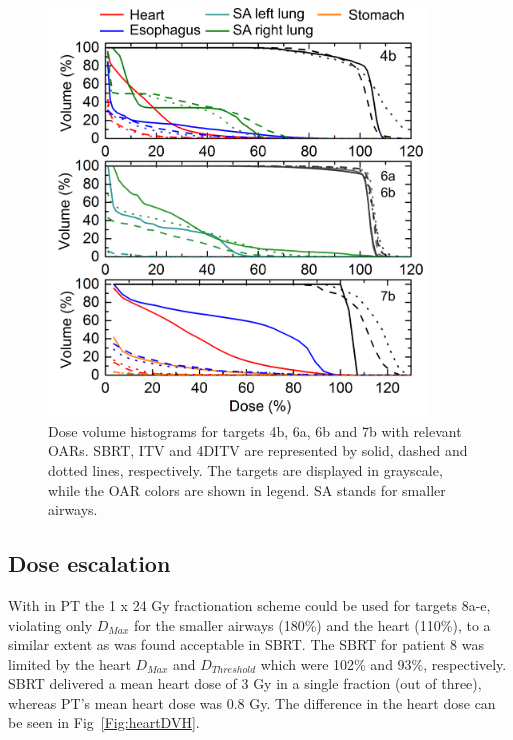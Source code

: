 \newpage
\begin{figure}[H]
	\begin{center}
		\includegraphics[width=0.9\textwidth]{./ComplexPatients/Images/DVH_legend.png}
		\caption{Dose volume histograms for targets 4b, 6a, 6b and 7b with relevant OARs. SBRT, ITV and 4DITV are represented by solid, dashed and dotted lines, respectively. The targets are displayed
		in grayscale, while the OAR colors are shown in legend. SA stands for smaller airways.}
		\label{Fig:dvh}
	\end{center}
\end{figure}
\newpage


\subsection{Dose escalation}

With in PT the 1 x 24 Gy fractionation scheme could be used for targets 8a-e, violating only $D_{Max}$ for the smaller airways (180\%) and the heart (110\%), to
a similar extent as was found acceptable in SBRT.
The SBRT for patient 8 was limited by the heart $D_{Max}$ and $D_{Threshold}$ which were 102\% and 93\%, respectively. SBRT delivered a mean heart dose of 
3 Gy in a single fraction (out of three), whereas PT's mean heart dose was 0.8 Gy.
The difference in the heart dose can be seen in Fig~\ref{Fig:heartDVH}.

